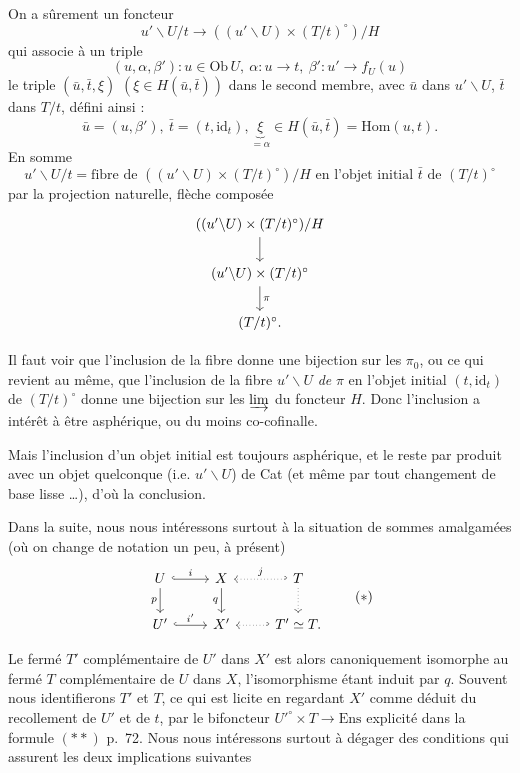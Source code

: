 \documentclass[11pt]{article}
\newcommand{\printedpage}[1]{\marginpar{\footnotesize p.~#1}}
\newcommand{\msp}[1]{\marginpar{\footnotesize [#1]}}
\newcommand{\Hom}{\mathrm{Hom}}
\newcommand{\id}{\mathrm{id}}
\newcommand{\Ob}{\mathrm{Ob}\,}
\begin{document}
\msp{page 73} On a sûrement un foncteur
\[
u'\backslash U/t \longrightarrow ((u'\backslash U)\times(T/t)^{\circ})/H
\]
qui associe à un triple
\[
(u,\alpha,\beta') : u\in \Ob U,\ \alpha : u\longrightarrow t,\ \beta' : u'\longrightarrow f_U(u)
\]
le triple $(\bar u,\bar t,\xi)$ $(\xi\in H(\bar u,\bar t))$ dans le second membre, avec $\bar u$ dans $u'\backslash U$, $\bar t$ dans $T/t$, défini ainsi :
\[
\bar u = (u,\beta'),\ \bar t = (t,\id_t), \underbrace{\xi}_{=\alpha} \in H(\bar u,\bar t) = \Hom(u,t).
\]
En somme
\[
u'\backslash U/t = \text{fibre de } ((u'\backslash U)\times(T/t)^{\circ})/H \text{ en l'objet initial } \bar t \text{ de } (T/t)^{\circ}
\]
par la projection naturelle, flèche composée
\[
\begin{tikzcd}
((u'\backslash U)\times(T/t)^{\circ})/H \arrow[d] \\
(u'\backslash U)\times(T/t)^{\circ} \arrow[d, "\pi"] \\
(T/t)^{\circ}.
\end{tikzcd}
\]

Il faut voir que l'inclusion de la fibre donne une bijection sur les $\pi_0$, ou ce qui revient au même, que l'inclusion de la fibre $u'\backslash U$ \textit{de} $\pi$ en l'objet initial $(t,\id_t)$ de $(T/t)^{\circ}$ donne une bijection sur les $\varinjlim$ du foncteur $H$. Donc l'inclusion a intérêt à être asphérique, ou du moins co-cofinalle. %

\printedpage{53}

\msp{page 74}
Mais l'inclusion d'un objet initial est toujours asphérique, et le reste par produit avec un objet quelconque (i.e. $u'\backslash U$) de Cat (et même par tout changement de base lisse \dots), d'où la conclusion.

Dans la suite, nous nous intéressons surtout à la situation de sommes amalgamées (où on change de notation un peu, à présent)
\[
\begin{tikzcd}
U \arrow[r, hook, "i"] \arrow[d, "p"'] & X \arrow[d, "q"'] & T \arrow[l, hook', dotted, "j"'] \arrow[d, dotted] \\
U' \arrow[r, hook, "i'"] & X' & T' \simeq T. \arrow[l, hook', dotted]
\end{tikzcd}
\tag*{$(*)$}
\]

Le fermé $T'$ complémentaire de $U'$ dans $X'$ est alors canoniquement isomorphe au fermé $T$ complémentaire de $U$ dans $X$, l'isomorphisme étant induit par $q$. Souvent nous identifierons $T'$ et $T$, ce qui est licite en regardant $X'$ comme déduit du recollement de $U'$ et de $t$, par le bifoncteur $U'^{\circ}\times T\longrightarrow \mathrm{Ens}$ explicité dans la formule $(**)$ p.~72. Nous nous intéressons surtout à dégager des conditions qui assurent les deux implications suivantes
\end{document}
